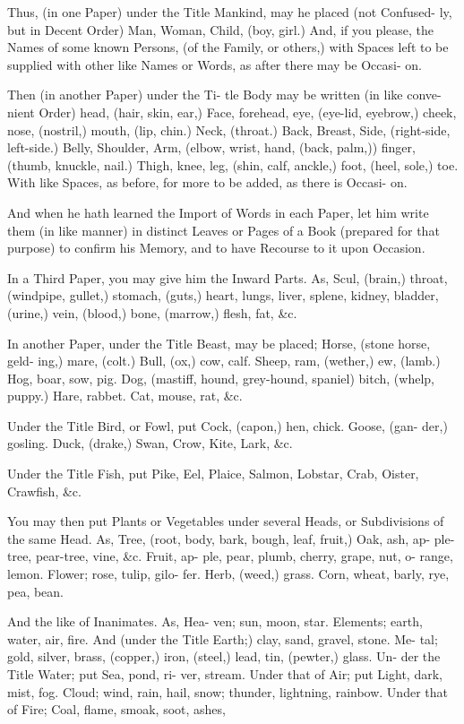 Thus, (in one Paper) under the Title
Mankind, may he placed (not Confused-
ly, but in Decent Order) Man, Woman,
Child, (boy, girl.) And, if you please,
the Names of some known Persons, (of
the Family, or others,) with Spaces left
to be supplied with other like Names or
Words, as after there may be Occasi-
on.

Then (in another Paper) under the Ti-
tle Body may be written (in like conve-
nient Order) head, (hair, skin, ear,)
Face, forehead, eye, (eye-lid, eyebrow,)
cheek, nose, (nostril,) mouth, (lip, chin.)
Neck, (throat.) Back, Breast, Side,
(right-side, left-side.) Belly, Shoulder,
Arm, (elbow, wrist, hand, (back, palm,))
finger, (thumb, knuckle, nail.) Thigh,
knee, leg, (shin, calf, anckle,) foot, (heel,
sole,) toe. With like Spaces, as before,
for more to be added, as there is Occasi-
on.

And when he hath learned the Import
of Words in each Paper, let him write
them (in like manner) in distinct Leaves
or Pages of a Book (prepared for that
purpose) to confirm his Memory, and to
have Recourse to it upon Occasion.

In a Third Paper, you may give him
the Inward Parts. As, Scul, (brain,)
throat, (windpipe, gullet,) stomach,
(guts,) heart, lungs, liver, splene, kidney,
bladder, (urine,) vein, (blood,) bone,
(marrow,) flesh, fat, &c.

In another Paper, under the Title Beast,
may be placed; Horse, (stone horse, geld-
ing,) mare, (colt.) Bull, (ox,) cow,
calf. Sheep, ram, (wether,) ew, (lamb.)
Hog, boar, sow, pig. Dog, (mastiff,
hound, grey-hound, spaniel) bitch, (whelp,
puppy.) Hare, rabbet. Cat, mouse,
rat, &c.

Under the Title Bird, or Fowl, put
Cock, (capon,) hen, chick. Goose, (gan-
der,) gosling. Duck, (drake,) Swan, Crow,
Kite, Lark, &c.

Under the Title Fish, put Pike, Eel,
Plaice, Salmon, Lobstar, Crab, Oister,
Crawfish, &c.

You may then put Plants or Vegetables
under several Heads, or Subdivisions of
the same Head. As, Tree, (root, body,
bark, bough, leaf, fruit,) Oak, ash, ap-
ple-tree, pear-tree, vine, &c. Fruit, ap-
ple, pear, plumb, cherry, grape, nut, o-
range, lemon. Flower; rose, tulip, gilo-
fer. Herb, (weed,) grass. Corn, wheat,
barly, rye, pea, bean.

And the like of Inanimates. As, Hea-
ven; sun, moon, star. Elements; earth,
water, air, fire. And (under the Title
Earth;) clay, sand, gravel, stone. Me-
tal; gold, silver, brass, (copper,) iron,
(steel,) lead, tin, (pewter,) glass. Un-
der the Title Water; put Sea, pond, ri-
ver, stream. Under that of Air; put
Light, dark, mist, fog. Cloud; wind,
rain, hail, snow; thunder, lightning,
rainbow. Under that of Fire; Coal,
flame, smoak, soot, ashes,

